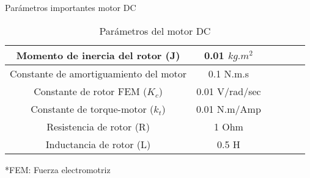 \documentclass{beamer}
\begin{document}
\begin{frame}{Parámetros importantes motor DC}
\begin{justify}
\vspace{0.3cm}
\begin{itemize}  
\begin{table}[htbp]
    \centering
    \caption{Parámetros del motor DC}
    \begin{tabular}{|c|c|c|c|c|c|}
        \hline
        Momento de inercia del rotor (J) & 0.01 $kg.m^2$ \\
        \hline
        Constante de amortiguamiento del motor & 0.1 N.m.s  \\
        \hline
        Constante de rotor FEM ($K_c$) & 0.01 V/rad/sec  \\
        \hline
        Constante de torque-motor ($k_t$) & 0.01 N.m/Amp \\
        \hline
        Resistencia de rotor (R) & 1 Ohm \\
        \hline
         Inductancia de rotor (L) & 0.5 H \\
        \hline
    \end{tabular}
\end{table}
*FEM: Fuerza electromotriz
\end{itemize}
\end{justify}
\end{frame}
\end{document}

